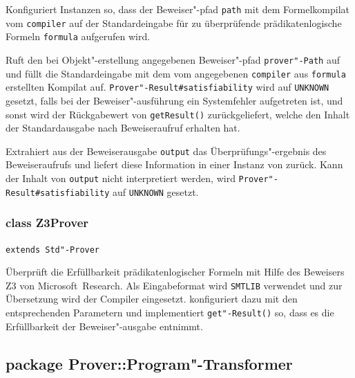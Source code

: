 \begin{description}%

    Konfiguriert Instanzen so, dass der Beweiser"-pfad \texttt{path} mit dem
    Formelkompilat vom \texttt{compiler} auf der Standardeingabe für zu überprüfende
    prädikatenlogische Formeln \texttt{formula} aufgerufen wird.%


    Ruft den bei Objekt"-erstellung angegebenen Beweiser"-pfad \texttt{prover"-Path} auf und
    füllt die Standardeingabe mit dem vom angegebenen \texttt{compiler} aus
    \texttt{formula} erstellten Kompilat auf.
    \texttt{Prover"-Result\#satisfiability} wird auf \texttt{UNKNOWN}
    gesetzt, falls bei der Beweiser"-ausführung ein Systemfehler
    aufgetreten ist, und sonst wird der Rückgabewert von
    \texttt{getResult()} zurückgeliefert, welche den Inhalt der
    Standardausgabe nach Beweiseraufruf erhalten hat.%


    Extrahiert aus der Beweiserausgabe \texttt{output} das Überprüfungs"-ergebnis
    des Beweiseraufrufs und liefert diese Information in einer
    Instanz von  zurück. Kann der Inhalt von
    \texttt{output} nicht interpretiert werden, wird
    \texttt{Prover"-Result\#satisfiability} auf \texttt{UNKNOWN} gesetzt.%

\end{description}%

\subsubsection{class Z3Prover}%

\texttt{extends Std"-Prover}%

Überprüft die Erfüllbarkeit prädikatenlogischer Formeln mit Hilfe des
Beweisers Z3 von Microsoft~Research. Als Eingabeformat wird
\texttt{SMTLIB} verwendet und zur Übersetzung wird der Compiler
 eingesetzt.  konfiguriert dazu
 mit den entsprechenden Parametern und implementiert
\texttt{get"-Result()} so, dass es die Erfüllbarkeit der
Beweiser"-ausgabe entnimmt.%

\subsection{package Prover::Program"-Transformer}%


